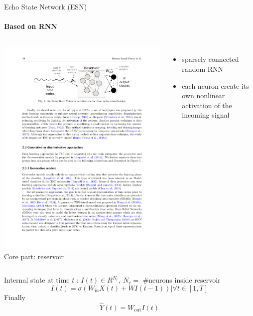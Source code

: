 \documentclass[aspectratio=169]{ctexbeamer}
\begin{document}
\begin{frame}{Echo State Network (ESN)}
	\framesubtitle{Based on RNN}
	\begin{columns}
		\includegraphics[width=\textwidth]{figure/esn}
		Core part: reservoir
		\begin{itemize}
			\item sparsely connected random RNN
			\item each neuron create its own nonlinear activation of the incoming signal
		\end{itemize}
	\end{columns}
			Internal state at time $t$ : $I(t) \in R^{N_r}$, $N_r = $ \#neurons inside reservoir
			$$I(t) = \sigma (W_{\text{in}} X(t) + W I(t-1)) | \forall t \in [1,T]$$
			Finally
			$${\hat Y} (t) = W_{\text{out}} I(t)$$
\end{frame}
\end{document}
